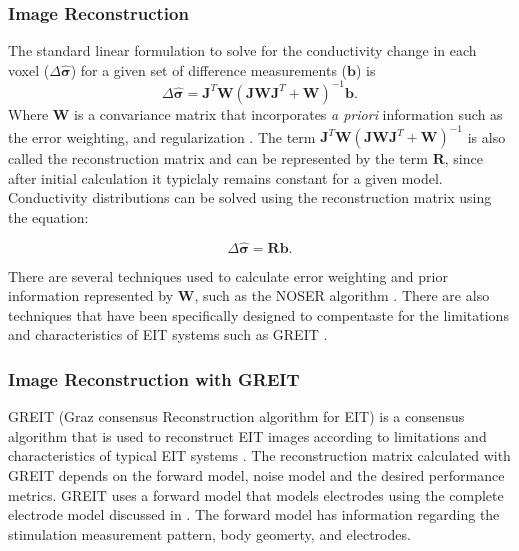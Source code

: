 \subsubsection{Image Reconstruction}
The standard linear formulation \parencite{holder_electrical_2004} 
to solve for the conductivity change in each 
voxel ($\Delta \mathbf{\hat{\sigma}}$) for a given set of difference measurements ($\mathbf{b}$) is
\begin{equation}
	\Delta \mathbf{\hat{\sigma}} = \mathbf{J}^T \mathbf{W} 
	(\mathbf{J} \mathbf{W} \mathbf{J}^T + \mathbf{W})^{-1} \mathbf{b}. 
\end{equation}
Where $\mathbf{W}$ is a convariance matrix that incorporates \emph{a priori} information such 
as the error weighting, and regularization \parencite{adler_electrical_1996}.
The term $ \mathbf{J}^T \mathbf{W} 
(\mathbf{J} \mathbf{W} \mathbf{J}^T + \mathbf{W})^{-1} $ is also called the 
reconstruction matrix and can be represented by the term
$\mathbf{R}$, since after initial calculation it typiclaly remains constant for a given model. 
Conductivity distributions can be solved using the reconstruction matrix using the equation:

\begin{equation} \label{eq:rm_solve}
	\Delta \mathbf{\hat{\sigma}} = \mathbf{R} \mathbf{b}. 
\end{equation}

There are several techniques used to calculate error weighting and prior information represented by 
$\mathbf{W}$,
such as the NOSER algorithm \parencite{cheney_noser_1990}. There are also 
techniques that have been specifically designed 
to compentaste for the limitations and characteristics of EIT systems 
such as GREIT \parencite{adler_greit_2009}.

\subsubsection{Image Reconstruction with GREIT}

GREIT (Graz consensus Reconstruction algorithm for EIT) is 
a consensus algorithm that is used to reconstruct EIT images 
according to limitations and characteristics of typical EIT systems 
\parencite{adler_greit_2009}. 
The reconstruction matrix calculated with GREIT depends on the
forward model, noise model and the desired performance metrics.
GREIT uses a forward model that models electrodes using 
the complete electrode model discussed in .
The forward model has information regarding the stimulation measurement pattern,
body geomerty, and electrodes.

